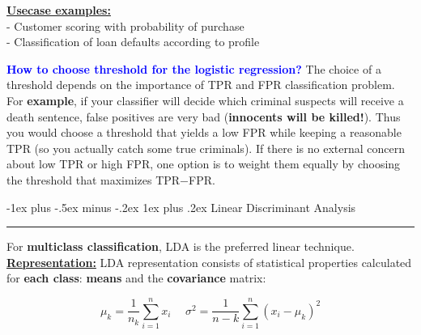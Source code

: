 \documentclass[letterpaper, 10.5pt,landscape]{article}
\makeatletter
\renewcommand{\subsubsection}{\@startsection{subsubsection}{3}{0mm}%
                                {-1ex plus -.5ex minus -.2ex}%
                                {1ex plus .2ex}%
                                {\normalfont\small\bfseries}}
\makeatother
\begin{document}
\begin{multicols*}{3}
\vspace{2pt}
\textbf{\underline{Usecase examples:}} \\
- Customer scoring with probability of purchase \\
- Classification of loan defaults according to profile


\vspace{3pt}
\textbf{\textcolor{blue}{How to choose threshold for the logistic regression?}}
The choice of a threshold depends on the importance of TPR and FPR classification problem. For \textbf{example}, if your classifier will decide which criminal suspects will receive a death sentence, false positives are very bad (\textbf{innocents will be killed!}). Thus you would choose a threshold that yields a low FPR while keeping a reasonable TPR (so you actually catch some true criminals). If there is no external concern about low TPR or high FPR, one option is to weight them equally by choosing the threshold that maximizes TPR$-$FPR.


\subsubsection{Linear Discriminant Analysis} {\color{teal}\hrule height 0.5pt} \smallskip

For \textbf{multiclass classification}, LDA is the preferred linear
technique. \\

\textbf{\underline{Representation:}} LDA representation consists of statistical properties calculated for \textbf{each class}: \textbf{means} and the \textbf{covariance} matrix: 

\vspace{-5pt}


\[\boxed{\mu_{k} = \frac{1}{n_{k}} \sum^{n}_{i=1} x_{i}}   \hspace{15pt} \boxed{\sigma^{2} = \frac{1}{n-k} \sum^{n}_{i=1} (x_{i} - \mu_{k})^{2}} \]


\end{multicols*}
\end{document}
